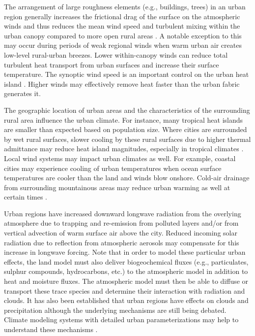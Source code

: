 \documentclass[12pt,authoryear]{elsarticle}
\numberwithin{equation}{section} %
\begin{document}
The arrangement of large roughness elements (e.g., buildings, trees) in an urban region generally increases the frictional drag of the surface on the atmospheric winds and thus reduces the mean wind speed and turbulent mixing within the urban canopy compared to more open rural areas \citep{okeBoundaryLayerClimates1987}. A notable exception to this may occur during periods of weak regional winds when warm urban air creates low-level rural-urban breezes. Lower within-canopy winds can reduce total turbulent heat transport from urban surfaces and increase their surface temperature. The synoptic wind speed is an important control on the urban heat island \citep{landsbergUrbanClimate1981}. Higher winds may effectively remove heat faster than the urban fabric generates it.

The geographic location of urban areas and the characteristics of the surrounding rural area influence the urban climate. For instance, many tropical heat islands are smaller than expected based on population size. Where cities are surrounded by wet rural surfaces, slower cooling by these rural surfaces due to higher thermal admittance may reduce heat island magnitudes, especially in tropical climates \citep{okeSimulationSurfaceUrban1991}. Local wind systems may impact urban climates as well. For example, coastal cities may experience cooling of urban temperatures when ocean surface temperatures are cooler than the land and winds blow onshore. Cold-air drainage from surrounding mountainous areas may reduce urban warming as well at certain times \citep{comrieMappingWindModifiedUrban2000}.

Urban regions have increased downward longwave radiation from the overlying atmosphere due to trapping and re-emission from polluted layers and/or from vertical advection of warm surface air above the city. Reduced incoming solar radiation due to reflection from atmospheric aerosols may compensate for this increase in longwave forcing. Note that in order to model these particular urban effects, the land model must also deliver biogeochemical fluxes (e.g., particulates, sulphur compounds, hydrocarbons, etc.) to the atmospheric model in addition to heat and moisture fluxes. The atmospheric model must then be able to diffuse or transport these trace species and determine their interaction with radiation and clouds. It has also been established that urban regions have
effects on clouds and precipitation although the underlying mechanisms are still being debated. Climate modeling systems with detailed urban parameterizations may help to understand these mechanisms \citep{shepherdReviewCurrentInvestigations2005}.
\end{document}
